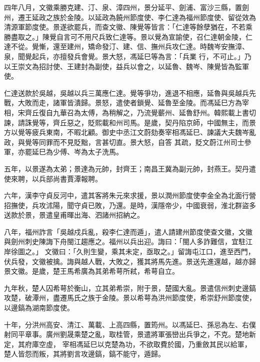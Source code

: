 \begin{pinyinscope}
 四年八月，文徽乘勝克建、汀、泉、漳四州，景分延平、劍浦、富沙三縣，置劍州，遷王延政之族於金陵。以延政為饒州節度使、李仁達為福州節度使、留從效為清源軍節度使。景遂欲罷兵，而查文徽、陳覺等皆言：「仁達等餘孽猶在，不若乘勝盡取之。」陳覺自言可不用尺兵致仁達等。景以覺為宣諭使，召仁達朝金陵，仁達不從。覺慚，還至建州，矯命發汀、建、信、撫州兵攻仁達。時魏岑安撫漳、泉，聞覺起兵，亦擅發兵會覺。景大怒，馮延巳等為言：「兵業
 行，不可止。」乃以王崇文為招討使、王建封為副使，益兵以會之，以延魯、魏岑、陳覺皆為監軍使。



 仁達送款於吳越，吳越以兵三萬應仁達。覺等爭功，進退不相應，延魯與吳越兵先戰，大敗而走，諸軍皆潰歸。景怒，遣使者鎖覺、延魯至金陵。而馮延巳方為宰相，宋齊丘復自九華召為太傅，為稍解之，乃流覺蘄州、延魯舒州。韓熙載上書切諫，請誅覺等，齊丘惡之，貶熙載和州司馬。是歲，契丹陷京師，中國無主，而景方以覺等疲兵東南，不暇北顧。御史中丞江文蔚劾奏宰相馮延巳、諫議大夫魏岑亂政，與覺等同罪而不見貶黜，言甚切直。景大怒，自答
 其疏，貶文蔚江州司士參軍，亦罷延巳為少傅、岑為太子洗馬。



 五年，以景遂為太弟；景達為元帥，封齊王；南昌王冀為副元帥，封燕王。契丹遣使來聘，以兵部尚書賈潭報聘。



 六年，漢李守貞反河中，遣其客將朱元來求援，景以潤州節度使李金全為北面行營招撫使，兵攻沭陽，聞守貞已敗，乃還。是時，漢隱帝少，中國衰弱，淮北群盜多送款於景，景遣皇甫暉出海、泗諸州招納之。



 八年，福州詐言「吳越戍兵亂，殺李仁達而遁」，遣人請建州節度使查文徽，文徽與劍州刺史陳誨下舟閩江趨應之。福州以兵出迎。誨曰：「閩人多詐難信，宜駐江岸徐圖之。」
 文徽曰：「久則生變，乘其未定，亟取之。」留誨屯江口，進至西門，伏兵發，文徽被擒。誨與越人戰，大敗之，獲其將馬先進。景送先進還越，越亦歸景文徽。是歲，楚王馬希廣為其弟希萼所弒，希萼自立。



 九年秋，楚人囚希萼於衡山，立其弟希崇，附于景，楚國大亂。景遣信州刺史邊鎬攻楚，破潭州，盡遷馬氏之族于金陵。景以希萼為洪州節度使，希崇舒州節度使，以邊鎬為湖南節度使。



 十年，分洪州高安、清江、萬載、上高四縣，置筠州。以馮延巳、孫忌為左、右僕射同平章事。廣州劉晟乘楚之亂，取桂管，景遣將軍張巒出兵爭之，不克。楚地新定，其府庫空虛，
 宰相馮延巳以克楚為功，不欲取費於國，乃重斂其民以給軍，楚人皆怨而叛，其將劉言攻邊鎬，鎬不能守，遁歸。




\end{pinyinscope}
